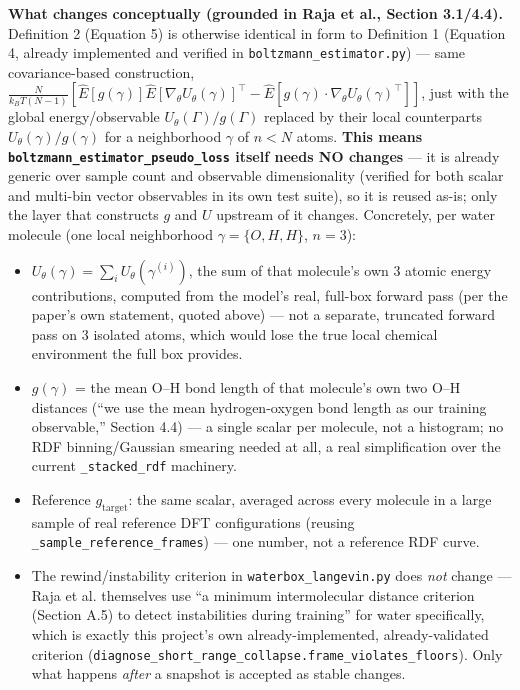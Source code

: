 \documentclass[11pt]{article}
\begin{document}
\textbf{What changes conceptually (grounded in Raja et al., Section 3.1/4.4).}
Definition 2 (Equation 5) is otherwise identical in form to Definition 1
(Equation 4, already implemented and verified in
\texttt{boltzmann\_estimator.py}) --- same covariance-based construction,
$\frac{N}{k_BT(N-1)}\left[\hat{E}[g(\gamma)]\hat{E}[\nabla_\theta
U_\theta(\gamma)]^\top - \hat{E}[g(\gamma)\cdot\nabla_\theta
U_\theta(\gamma)^\top]\right]$, just with the global energy/observable
$U_\theta(\Gamma)/g(\Gamma)$ replaced by their local counterparts
$U_\theta(\gamma)/g(\gamma)$ for a neighborhood $\gamma$ of $n<N$ atoms.
\textbf{This means \texttt{boltzmann\_estimator\_pseudo\_loss} itself needs
NO changes} --- it is already generic over sample count and observable
dimensionality (verified for both scalar and multi-bin vector observables
in its own test suite), so it is reused as-is; only the layer that
constructs $g$ and $U$ upstream of it changes. Concretely, per water
molecule (one local neighborhood $\gamma=\{O,H,H\}$, $n=3$):
\begin{itemize}
  \item $U_\theta(\gamma) = \sum_i U_\theta(\gamma^{(i)})$, the sum of that
  molecule's own 3 atomic energy contributions, computed from the model's
  real, full-box forward pass (per the paper's own statement, quoted
  above) --- not a separate, truncated forward pass on 3 isolated atoms,
  which would lose the true local chemical environment the full box
  provides.
  \item $g(\gamma)$ = the mean O--H bond length of that molecule's own two
  O--H distances (``we use the mean hydrogen-oxygen bond length as our
  training observable,'' Section 4.4) --- a single scalar per molecule,
  not a histogram; no RDF binning/Gaussian smearing needed at all, a real
  simplification over the current \texttt{\_stacked\_rdf} machinery.
  \item Reference $g_{\text{target}}$: the same scalar, averaged across
  every molecule in a large sample of real reference DFT configurations
  (reusing \texttt{\_sample\_reference\_frames}) --- one number, not a
  reference RDF curve.
  \item The rewind/instability criterion in \texttt{waterbox\_langevin.py}
  does \emph{not} change --- Raja et al. themselves use ``a minimum
  intermolecular distance criterion (Section A.5) to detect instabilities
  during training'' for water specifically, which is exactly this
  project's own already-implemented, already-validated criterion
  (\texttt{diagnose\_short\_range\_collapse.frame\_violates\_floors}). Only
  what happens \emph{after} a snapshot is accepted as stable changes.
\end{itemize}
\end{document}
